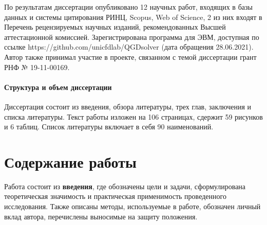 \documentclass[utf8x]{G7-32} %
\begin{document}
По результатам диссертации опубликовано 12 научных работ, входящих в базы данных и системы цитирования РИНЦ, Scopus, Web of Science, 2 из них входят в Перечень рецензируемых научных изданий, рекомендованных Высшей аттестационной комиссией. Зарегистрирована программа для ЭВМ, доступная по ссылке https://github.com/unicfdlab/QGDsolver (дата обращения 28.06.2021). Автор также принимал участие в проекте, связанном с темой диссертации грант РНФ № 19-11-00169.

\paragraph{Структура и объем диссертации}

Диссертация состоит из введения, обзора литературы, трех глав, заключения и списка литературы. Текст работы изложен на 106 страницах, сдержит 59 рисунков и 6 таблиц. Список литературы включает в себя 90 наименований. 


















































\renewcommand\thefigure{\arabic{figure}}

\section*{Содержание работы}

Работа состоит из \textbf{введения}, где обозначены цели и задачи, сформулирована теоретическая значимость и практическая применимость проведенного исследования.  Также описаны методы, используемые в работе, обозначен личный вклад автора, перечислены выносимые на защиту положения.
\end{document}
